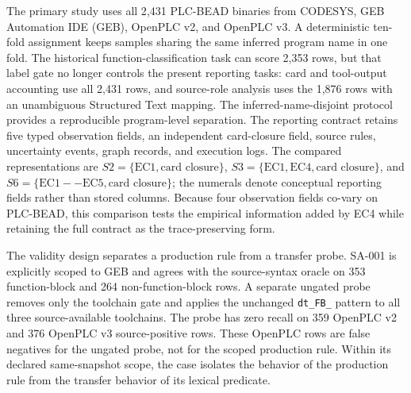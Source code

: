 \documentclass[a4paper,fleqn]{cas-dc}
\begin{document}
The primary study uses all 2{,}431 PLC-BEAD binaries from CODESYS, GEB Automation IDE (GEB), OpenPLC v2, and OpenPLC v3. A deterministic ten-fold assignment keeps samples sharing the same inferred program name in one fold. The historical function-classification task can score 2{,}353 rows, but that label gate no longer controls the present reporting tasks: card and tool-output accounting use all 2{,}431 rows, and source-role analysis uses the 1{,}876 rows with an unambiguous Structured Text mapping. The inferred-name-disjoint protocol provides a reproducible program-level separation. The reporting contract retains five typed observation fields, an independent card-closure field, source rules, uncertainty events, graph records, and execution logs. The compared representations are \(S2=\{\mathrm{EC1},\text{card closure}\}\), \(S3=\{\mathrm{EC1},\mathrm{EC4},\text{card closure}\}\), and \(S6=\{\mathrm{EC1--EC5},\text{card closure}\}\); the numerals denote conceptual reporting fields rather than stored columns. Because four observation fields co-vary on PLC-BEAD, this comparison tests the empirical information added by EC4 while retaining the full contract as the trace-preserving form.

The validity design separates a production rule from a transfer probe. SA-001 is explicitly scoped to GEB and agrees with the source-syntax oracle on 353 function-block and 264 non-function-block rows. A separate ungated probe removes only the toolchain gate and applies the unchanged \texttt{dt\_FB\_} pattern to all three source-available toolchains. The probe has zero recall on 359 OpenPLC v2 and 376 OpenPLC v3 source-positive rows. These OpenPLC rows are false negatives for the ungated probe, not for the scoped production rule. Within its declared same-snapshot scope, the case isolates the behavior of the production rule from the transfer behavior of its lexical predicate.
\end{document}
